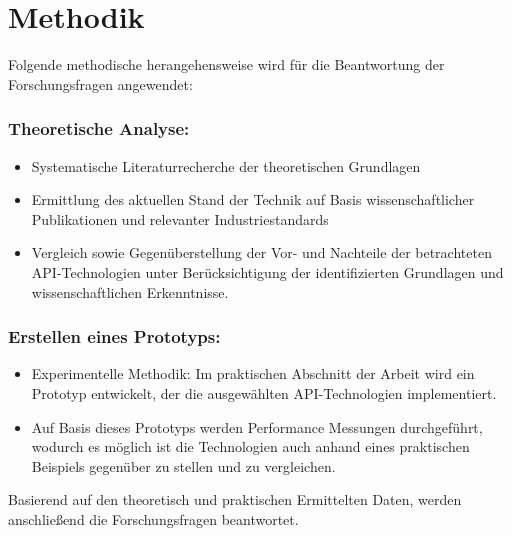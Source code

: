 \section{Methodik}
Folgende methodische herangehensweise wird für die Beantwortung der Forschungsfragen angewendet:

\subsubsection*{Theoretische Analyse:}
\begin{itemize}
	\item Systematische Literaturrecherche der theoretischen Grundlagen
	\item Ermittlung des aktuellen Stand der Technik auf Basis wissenschaftlicher Publikationen und relevanter Industriestandards
	\item Vergleich sowie Gegenüberstellung der Vor- und Nachteile der betrachteten API-Technologien unter Berücksichtigung der identifizierten Grundlagen und wissenschaftlichen Erkenntnisse.
\end{itemize}

\subsubsection*{Erstellen eines Prototyps:}
\begin{itemize}
	\item Experimentelle Methodik: Im praktischen Abschnitt der Arbeit wird ein Prototyp entwickelt, der die ausgewählten  API-Technologien implementiert.
	\item Auf Basis dieses Prototyps werden Performance Messungen durchgeführt, wodurch es möglich ist die Technologien auch anhand eines praktischen Beispiels gegenüber zu stellen und zu vergleichen.
\end{itemize}



Basierend auf den theoretisch und praktischen Ermittelten Daten, werden anschließend die Forschungsfragen beantwortet.
\chapterend
